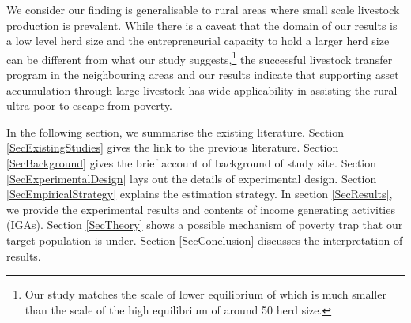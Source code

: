 	
	We consider our finding is generalisable to rural areas where small scale livestock production is prevalent. While there is a caveat that the domain of our results is a low level herd size and the entrepreneurial capacity to hold a larger herd size can be different from what our study suggests,\footnote{Our study matches the scale of lower equilibrium of \citet{Lybbertetal2004} which is much smaller than the scale of the high equilibrium of around 50 herd size. } the successful livestock transfer program in the neighbouring areas \citep{BandieraBRAC2017, Balboni2020} and our results indicate that supporting asset accumulation through large livestock has wide applicability in assisting the rural ultra poor to escape from poverty.


	In the following section, we summarise the existing literature. Section \ref{SecExistingStudies} gives the link to the previous literature. Section \ref{SecBackground} gives the brief account of background of study site. Section \ref{SecExperimentalDesign} lays out the details of experimental design. Section \ref{SecEmpiricalStrategy} explains the estimation strategy. In section \ref{SecResults}, we provide the experimental results and contents of income generating activities (IGAs). Section \ref{SecTheory} shows a possible mechanism of poverty trap that our target population is under. Section \ref{SecConclusion} discusses the interpretation of results.

